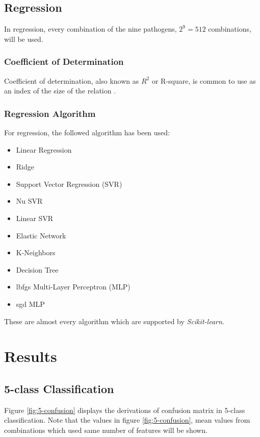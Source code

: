 \documentclass[aps, 11pt, a4paper]{article}
\begin{document}
		\subsection{Regression}
			In regression, every combination of the nine pathogens, $2^9 = 512$ combinations, will be used. 
			\subsubsection{Coefficient of Determination}
				Coefficient of determination, also known as $R^2$ or R-square, is common to use as an index of the size of the relation \cite{ref:rsquare1}. 
				
			\subsubsection{Regression Algorithm}
				For regression, the followed algorithm has been used:
				\begin{itemize}
					\item Linear Regression
					\item Ridge
					\item Support Vector Regression (SVR)
					\item Nu SVR
					\item Linear SVR
					\item Elastic Network
					\item K-Neighbors
					\item Decision Tree
					\item lbfgs Multi-Layer Perceptron (MLP)
					\item sgd MLP
				\end{itemize}
				These are almost every algorithm which are supported by \textit{Scikit-learn}.
    
    \section{Results}
    	\subsection{5-class Classification}
    		Figure \ref{fig:5-confusion} displays the derivations of confusion matrix in 5-class classification. Note that the values in figure \ref{fig:5-confusion}, mean values from combinations which used same number of features will be shown. 
    		
\end{document}
